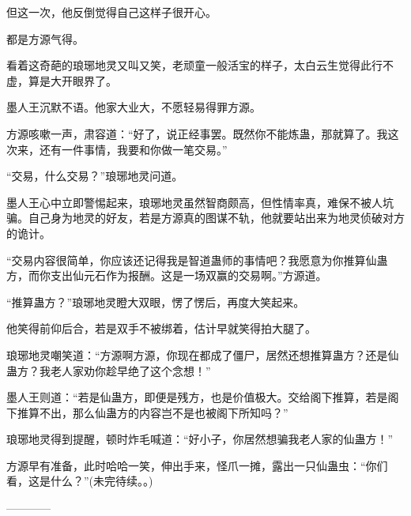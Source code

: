 \begin{this_body}
但这一次，他反倒觉得自己这样子很开心。

都是方源气得。

看着这奇葩的琅琊地灵又叫又笑，老顽童一般活宝的样子，太白云生觉得此行不虚，算是大开眼界了。

墨人王沉默不语。他家大业大，不愿轻易得罪方源。

方源咳嗽一声，肃容道：“好了，说正经事罢。既然你不能炼蛊，那就算了。我这次来，还有一件事情，我要和你做一笔交易。”

“交易，什么交易？”琅琊地灵问道。

墨人王心中立即警惕起来，琅琊地灵虽然智商颇高，但性情率真，难保不被人坑骗。自己身为地灵的好友，若是方源真的图谋不轨，他就要站出来为地灵侦破对方的诡计。

“交易内容很简单，你应该还记得我是智道蛊师的事情吧？我愿意为你推算仙蛊方，而你支出仙元石作为报酬。这是一场双赢的交易啊。”方源道。

“推算蛊方？”琅琊地灵瞪大双眼，愣了愣后，再度大笑起来。

他笑得前仰后合，若是双手不被绑着，估计早就笑得拍大腿了。

琅琊地灵嘲笑道：“方源啊方源，你现在都成了僵尸，居然还想推算蛊方？还是仙蛊方？我老人家劝你趁早绝了这个念想！”

墨人王则道：“若是仙蛊方，即便是残方，也是价值极大。交给阁下推算，若是阁下推算不出，那么仙蛊方的内容岂不是也被阁下所知吗？”

琅琊地灵得到提醒，顿时炸毛喊道：“好小子，你居然想骗我老人家的仙蛊方！”

方源早有准备，此时哈哈一笑，伸出手来，怪爪一摊，露出一只仙蛊虫：“你们看，这是什么？”(未完待续。。)

------------

\end{this_body}

